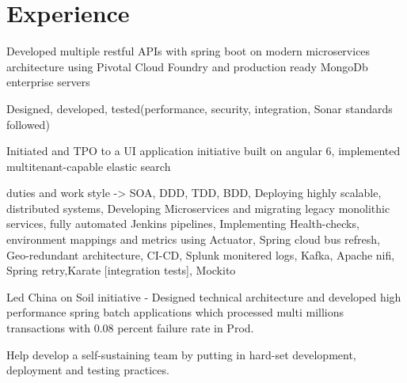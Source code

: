 \documentclass[]{deedy-resume-openfont}
\begin{document}
\begin{minipage}[t]{0.33\textwidth}
%
%

\end{minipage} 
\hfill
\begin{minipage}[t]{0.66\textwidth} 


\section{Experience}
\vspace{\topsep} %
\begin{tightemize}
\item Developed multiple restful APIs with spring boot on modern microservices architecture using Pivotal Cloud Foundry and production ready MongoDb enterprise servers
\item Designed, developed, tested(performance, security, integration, Sonar standards followed)
\item Initiated and TPO to a UI application initiative built on angular 6, implemented  multitenant-capable elastic search
\item duties and work style -> SOA, DDD, TDD, BDD, Deploying highly scalable, distributed systems, Developing Microservices and migrating legacy monolithic services, fully automated Jenkins pipelines, Implementing Health-checks, environment mappings and metrics using Actuator, Spring cloud bus refresh, Geo-redundant architecture, CI-CD, Splunk monitered logs, Kafka, Apache nifi, Spring retry,Karate [integration tests], Mockito
\item Led China on Soil initiative - Designed technical architecture and developed high performance spring batch applications which processed multi millions transactions with 0.08 percent failure rate in Prod. 
\item Help develop a self-sustaining team by putting in hard-set development, deployment and testing practices.
\end{tightemize}
\sectionsep


\end{minipage}
\end{document}
